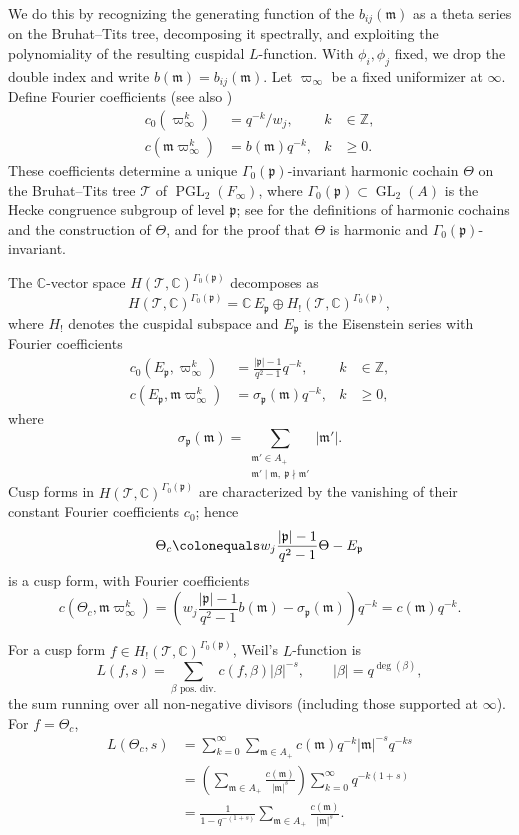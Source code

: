 \documentclass[12pt]{amsart}
\theoremstyle{definition}
\theoremstyle{remark}
\numberwithin{equation}{section}
\numberwithin{thm}{section}
\DeclareMathOperator{\GL}{GL}
\DeclareMathOperator{\PGL}{PGL}
\newcommand{\fm}{\mathfrak{m}}
\newcommand{\fp}{\mathfrak{p}}
\newcommand{\cT}{\mathcal{T}}
\newcommand{\C}{\mathbb{C}}
\newcommand{\Z}{\mathbb{Z}}
\newcommand{\G}{\Gamma}
\newcommand{\Fi}{F_\infty}
\newcommand{\abs}[1]{\left|#1\right|}
\begin{document}
	We do this by recognizing the generating function of the $b_{ij}(\fm)$ as a theta series on the Bruhat--Tits tree, decomposing it spectrally, and exploiting the polynomiality of the resulting cuspidal $L$-function. With $\phi_i, \phi_j$ fixed, we drop the double index and write $b(\fm) = b_{ij}(\fm)$. Let $\varpi_\infty$ be a fixed uniformizer at $\infty$. Define Fourier coefficients \cite[p. 735]{WY} (see also \cite[p. 271]{PapikianJNT05})
	\begin{align*}
		c_0(\varpi_\infty^k) &= q^{-k}/w_j, & k&\in \Z, \\
		c(\fm \varpi_\infty^k) &= b(\fm) q^{-k}, & k&\geq 0.
	\end{align*}
	These coefficients determine a unique $\G_0(\fp)$-invariant harmonic cochain $\Theta$ on the Bruhat--Tits tree $\cT$ of $\PGL_2(\Fi)$, where $\G_0(\fp)\subset \GL_2(A)$ is the Hecke congruence subgroup of level $\fp$; see \cite{WY,PapikianJNT05} for the definitions of harmonic cochains and the construction of $\Theta$, and for the proof that $\Theta$ is harmonic and $\G_0(\fp)$-invariant.
	
	The $\C$-vector space $H(\cT,\C)^{\G_0(\fp)}$ decomposes as \cite[Prop. 3.4]{PapikianJNT05}
	\[
	H(\cT,\C)^{\G_0(\fp)} = \C\, E_\fp \oplus H_!(\cT,\C)^{\G_0(\fp)},
	\]
	where $H_!$ denotes the cuspidal subspace and $E_\fp$ is the Eisenstein series with Fourier coefficients
	\begin{align*}
		c_0(E_\fp, \varpi_\infty^k) &= \frac{\abs{\fp}-1}{q^2-1} q^{-k}, & k&\in \Z, \\
		c(E_\fp, \fm \varpi_\infty^k) &= \sigma_\fp(\fm) q^{-k}, & k&\geq 0,
	\end{align*}
	where
	\[
	\sigma_\fp(\fm) = \sum_{\substack{\fm'\in A_+\\ \fm'\mid \fm,\ \fp\nmid \fm'}} \abs{\fm'}.
	\]
	Cusp forms in $H(\cT,\C)^{\G_0(\fp)}$ are characterized by the vanishing of their constant Fourier coefficients $c_0$; hence
	\[
	\Theta_c \colonequals w_j \frac{\abs{\fp}-1}{q^2-1}\Theta - E_\fp
	\]
	is a cusp form, with Fourier coefficients
	\[
	c(\Theta_c, \fm\varpi_\infty^k) = \left(w_j\frac{\abs{\fp}-1}{q^2-1} b(\fm) - \sigma_\fp(\fm)\right) q^{-k} = c(\fm) q^{-k}.
	\]
	
	For a cusp form $f\in H_!(\cT,\C)^{\G_0(\fp)}$, Weil's $L$-function is \cite[p. 273]{PapikianJNT05}
	\[
	L(f,s) = \sum_{\beta\text{ pos. div.}} c(f,\beta) \abs{\beta}^{-s}, \qquad \abs{\beta} = q^{\deg(\beta)},
	\]
	the sum running over all non-negative divisors (including those supported at $\infty$). For $f = \Theta_c$,
	\begin{align*}
		L(\Theta_c, s) &= \sum_{k=0}^\infty \sum_{\fm\in A_+} c(\fm) q^{-k}\abs{\fm}^{-s} q^{-ks} \\
		&= \left(\sum_{\fm\in A_+}\frac{c(\fm)}{\abs{\fm}^s}\right)\sum_{k=0}^\infty q^{-k(1+s)} \\
		&= \frac{1}{1-q^{-(1+s)}}\sum_{\fm\in A_+}\frac{c(\fm)}{\abs{\fm}^s}.
	\end{align*}
	
\end{document}
